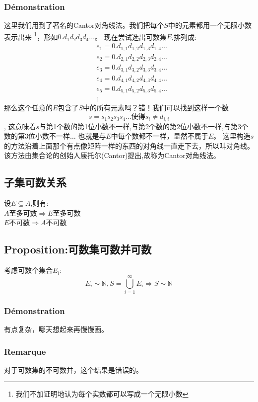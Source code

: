 \documentclass[12pt, a4paper, oneside]{ctexbook}
\begin{document}
  \subsubsection{Démonstration}
  这里我们用到了著名的Cantor对角线法。我们把每个$S$中的元素都用一个无限小数表示出来
  \footnote{我们不加证明地认为每个实数都可以写成一个无限小数}，形如$0.d_1d_2d_3d_4\dots$。
  现在尝试选出可数集$E$,排列成:
  $$
  \begin{aligned}&
    e_1=0.d_{1,1}d_{1,2}d_{1,3}d_{1,4}\dots\\ &
    e_2=0.d_{2,1}d_{2,2}d_{2,3}d_{2,4}\dots\\ &
    e_3=0.d_{3,1}d_{3,2}d_{3,3}d_{3,4}\dots\\ &
    e_4=0.d_{4,1}d_{4,2}d_{4,3}d_{4,4}\dots\\ &
    e_5=0.d_{5,1}d_{5,2}d_{5,3}d_{5,4}\dots\\ &
    \vdots 
      \end{aligned}
  $$
  那么这个任意的$E$包含了$S$中的所有元素吗？错！我们可以找到这样一个数
  $$s=s_1s_2s_3s_4\dots\text{使得}s_i\neq d_{i,i}$$,
  这意味着$s$与第1个数的第1位小数不一样,与第2个数的第2位小数不一样,与第3个数的第3位小数不一样$\dots$
  也就是与$E$中每个数都不一样，显然不属于$E$。
  这里构造$s$的方法沿着上面那个有点像矩阵一样的东西的对角线一直走下去，所以叫对角线。
  该方法由集合论的创始人康托尔(Cantor)提出,故称为Cantor对角线法。
  
  \subsection{子集可数关系}
  \noindent
  设$E\subseteq A$,则有:\\
  $A\text{至多可数}\Rightarrow E\text{至多可数}$\\
  $E\text{不可数}\Rightarrow A\text{不可数}$
  \subsection{Proposition:可数集可数并可数}\label{myref:keshujikeshubingkeshu}%
  考虑可数个集合$E_i$:
  $$
  E_i\sim\mathbb{N},S=\bigcup_{i=1}^\infty E_i\Rightarrow S\sim\mathbb{N}
  $$
  \subsubsection{Démonstration}
  有点复杂，哪天想起来再慢慢画。
  \subsubsection{Remarque}
  对于可数集的不可数并，这个结果是错误的。
\end{document}
